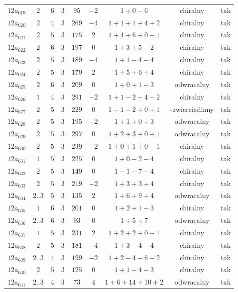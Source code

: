 \begin{longtable}{ccccccccc}
$12a_{619}$ & $2$ & $6$ & $3$ & $95$ & $-2$ & $1+0-6$ & chiralny & tak \\
$12a_{620}$ & $2$ & $4$ & $3$ & $269$ & $-4$ & $1+1+1+4+2$ & chiralny & tak \\
$12a_{621}$ & $2$ & $5$ & $3$ & $175$ & $2$ & $1+4+6+0-1$ & chiralny & tak \\
$12a_{622}$ & $2$ & $6$ & $3$ & $197$ & $0$ & $1+3+5-2$ & chiralny & tak \\
$12a_{623}$ & $2$ & $5$ & $3$ & $189$ & $-4$ & $1+1-4-4$ & chiralny & tak \\
$12a_{624}$ & $2$ & $5$ & $3$ & $179$ & $2$ & $1+5+6+4$ & chiralny & tak \\
$12a_{625}$ & $2$ & $6$ & $3$ & $209$ & $0$ & $1+0+1-3$ & odwracalny & tak \\
$12a_{626}$ & $1$ & $4$ & $3$ & $291$ & $-2$ & $1+1-2-4-2$ & chiralny & tak \\
$12a_{627}$ & $2$ & $5$ & $3$ & $229$ & $0$ & $1-1-2+0+1$ & -zwierciadlany & tak \\
$12a_{628}$ & $2$ & $5$ & $3$ & $195$ & $-2$ & $1+1+0+3$ & odwracalny & tak \\
$12a_{629}$ & $2$ & $5$ & $3$ & $297$ & $0$ & $1+2+3+0+1$ & odwracalny & tak \\
$12a_{630}$ & $2$ & $5$ & $3$ & $239$ & $-2$ & $1+0+1+0-1$ & chiralny & tak \\
$12a_{631}$ & $1$ & $5$ & $3$ & $225$ & $0$ & $1+0-2-4$ & chiralny & tak \\
$12a_{632}$ & $2$ & $5$ & $3$ & $149$ & $0$ & $1-1-7-4$ & chiralny & tak \\
$12a_{633}$ & $2$ & $5$ & $3$ & $219$ & $-2$ & $1+3+3+4$ & chiralny & tak \\
$12a_{634}$ & $2..3$ & $5$ & $3$ & $135$ & $2$ & $1+6+9+4$ & odwracalny & tak \\
$12a_{635}$ & $1$ & $6$ & $3$ & $201$ & $0$ & $1+2+1-3$ & chiralny & tak \\
$12a_{636}$ & $2..3$ & $6$ & $3$ & $93$ & $0$ & $1+5+7$ & odwracalny & tak \\
$12a_{637}$ & $1$ & $5$ & $3$ & $231$ & $2$ & $1+2+2+0-1$ & chiralny & tak \\
$12a_{638}$ & $2$ & $5$ & $3$ & $181$ & $-4$ & $1+3-4-4$ & chiralny & tak \\
$12a_{639}$ & $2..3$ & $4$ & $3$ & $199$ & $-2$ & $1+2-4-6-2$ & chiralny & tak \\
$12a_{640}$ & $2$ & $5$ & $3$ & $125$ & $0$ & $1+1-4-3$ & chiralny & tak \\
$12a_{641}$ & $2..3$ & $4$ & $3$ & $73$ & $4$ & $1+6+14+10+2$ & odwracalny & tak \\

\end{longtable}
